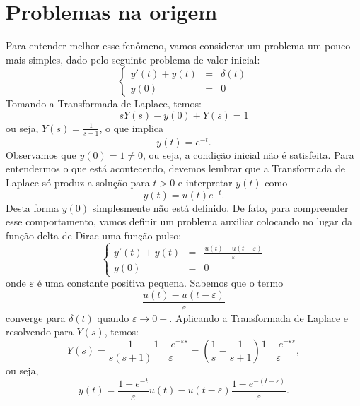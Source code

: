 \section{Problemas na origem}\label{problemas_na_origem}
Para entender melhor esse fenômeno, vamos considerar um problema um pouco mais simples, dado pelo seguinte problema de valor inicial:
\begin{equation*}
\left\{
\begin{array}{rcl}
y'(t)+y(t)&=&\delta(t)\\
y(0)&=&0
\end{array}
\right.
\end{equation*}
Tomando a Transformada de Laplace, temos:
\begin{equation*}
sY(s)-y(0)+Y(s)=1
\end{equation*}
ou seja, $Y(s)=\frac{1}{s+1}$, o que implica
\begin{equation}y(t)=e^{-t}.\end{equation}
Observamos que $y(0)=1\neq 0$, ou seja, a condição inicial não é satisfeita.
Para entendermos o que está acontecendo, devemos lembrar que a Transformada de Laplace só produz a solução para $t>0$ e interpretar $y(t)$ como
\begin{equation}y(t)=u(t)e^{-t}.\end{equation}
Desta forma $y(0)$ simplesmente não está definido. De fato, para compreender esse comportamento, vamos definir um problema auxiliar colocando no lugar da função delta de Dirac uma função pulso:
\begin{equation*}
\left\{
\begin{array}{rcl}
y'(t)+y(t)&=&\frac{u(t)-u(t-\varepsilon)}{\varepsilon}\\
y(0)&=&0
\end{array}
\right.
\end{equation*}
onde $\varepsilon$ é uma constante positiva pequena. Sabemos que o termo \begin{equation}\frac{u(t)-u(t-\varepsilon)}{\varepsilon}\end{equation} converge para $\delta(t)$ quando $\varepsilon \to 0+$. Aplicando a Transformada de Laplace e resolvendo para $Y(s)$, temos:
\begin{equation}Y(s)=\frac{1}{s(s+1)}\frac{1-e^{-\varepsilon s}}{\varepsilon}=\left(\frac{1}{s}-\frac{1}{s+1}\right)\frac{1-e^{-\varepsilon s}}{\varepsilon},\end{equation}
ou seja,
\begin{equation}y(t)=\frac{1-e^{-t}}{\varepsilon}u(t)-u(t-\varepsilon)\frac{1-e^{-(t-\varepsilon)}}{\varepsilon}.\end{equation}
